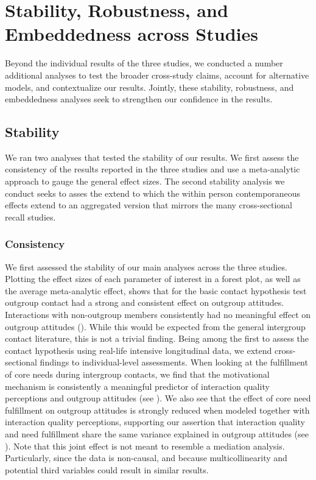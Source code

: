 \section{Stability, Robustness, and Embeddedness across Studies}

Beyond the individual results of the three studies, we conducted a
number additional analyses to test the broader cross-study claims,
account for alternative models, and contextualize our results. Jointly,
these stability, robustness, and embeddedness analyses seek to
strengthen our confidence in the results.

\subsection{Stability}

We ran two analyses that tested the stability of our results. We first
assess the consistency of the results reported in the three studies and
use a meta-analytic approach to gauge the general effect sizes. The
second stability analysis we conduct seeks to asses the extend to which
the within person contemporaneous effects extend to an aggregated
version that mirrors the many cross-sectional recall studies.

\subsubsection{Consistency}

We first assessed the stability of our main analyses across the three
studies. Plotting the effect sizes of each parameter of interest in a
forest plot, as well as the average meta-analytic effect, shows that for
the basic contact hypothesis test outgroup contact had a strong and
consistent effect on outgroup attitudes. Interactions with non-outgroup
members consistently had no meaningful effect on outgroup attitudes
(). While this would be expected from the
general intergroup contact literature, this is not a trivial finding.
Being among the first to assess the contact hypothesis using real-life
intensive longitudinal data, we extend cross-sectional findings to
individual-level assessments. When looking at the fulfillment of core
needs during intergroup contacts, we find that the motivational
mechanism is consistently a meaningful predictor of interaction quality
perceptions and outgroup attitudes (see
). We also see that the
effect of core need fulfillment on outgroup attitudes is strongly
reduced when modeled together with interaction quality perceptions,
supporting our assertion that interaction quality and need fulfillment
share the same variance explained in outgroup attitudes (see
). Note that this joint effect is
not meant to resemble a mediation analysis. Particularly, since the data
is non-causal, and because multicollinearity and potential third
variables could result in similar results.

